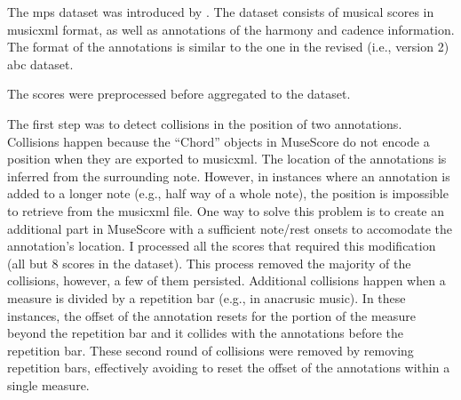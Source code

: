 

The \gls{mps} dataset was introduced by
\textcite{hentschel2021annotated}. The dataset consists of
musical scores in \gls{musicxml} format, as well as annotations of
the harmony and cadence information. The format of the
annotations is similar to the one in the revised (i.e.,
version 2) \gls{abc} dataset.


The scores were preprocessed before aggregated to the
dataset.

The first step was to detect collisions in the position of
two annotations. Collisions happen because the ``Chord''
objects in MuseScore do not encode a position when they are
exported to \gls{musicxml}. The location of the annotations is
inferred from the surrounding note. However, in instances
where an annotation is added to a longer note (e.g., half
way of a whole note), the position is impossible to retrieve
from the \gls{musicxml} file. One way to solve this problem is to
create an additional part in MuseScore with a sufficient
note/rest onsets to accomodate the annotation's location. I
processed all the scores that required this modification
(all but 8 scores in the dataset). This process removed
the majority of the collisions, however, a few of them
persisted. Additional collisions happen when a measure is
divided by a repetition bar (e.g., in anacrusic music). In
these instances, the offset of the annotation resets for the
portion of the measure beyond the repetition bar and it
collides with the annotations before the repetition bar.
These second round of collisions were removed by removing
repetition bars, effectively avoiding to reset the offset of
the annotations within a single measure.

